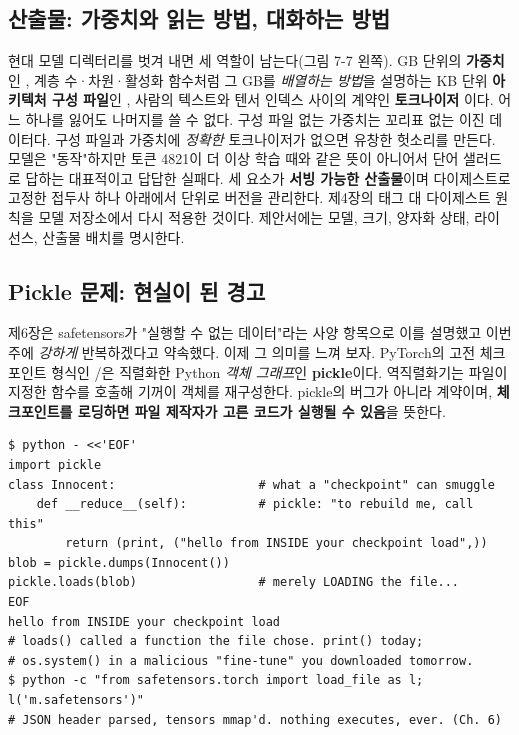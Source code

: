\subsection*{산출물: 가중치와 읽는 방법, 대화하는 방법}

현대 모델 디렉터리를 벗겨 내면 세 역할이 남는다(그림 7-7 왼쪽). GB 단위의 \textbf{가중치}인 , 계층 수·차원·활성화 함수처럼 그 GB를 \textit{배열하는 방법}을 설명하는 KB 단위 \textbf{아키텍처 구성 파일}인 , 사람의 텍스트와 텐서 인덱스 사이의 계약인 \textbf{토크나이저} 이다. 어느 하나를 잃어도 나머지를 쓸 수 없다. 구성 파일 없는 가중치는 꼬리표 없는 이진 데이터다. 구성 파일과 가중치에 \textit{정확한} 토크나이저가 없으면 유창한 헛소리를 만든다. 모델은 "동작"하지만 토큰 4821이 더 이상 학습 때와 같은 뜻이 아니어서 단어 샐러드로 답하는 대표적이고 답답한 실패다. 세 요소가 \textbf{서빙 가능한 산출물}이며 다이제스트로 고정한 접두사 하나 아래에서 단위로 버전을 관리한다. 제4장의 태그 대 다이제스트 원칙을 모델 저장소에서 다시 적용한 것이다. 제안서에는 모델, 크기, 양자화 상태, 라이선스, 산출물 배치를 명시한다.

\subsection*{Pickle 문제: 현실이 된 경고}

제6장은 safetensors가 "실행할 수 없는 데이터"라는 사양 항목으로 이를 설명했고 이번 주에 \textit{강하게} 반복하겠다고 약속했다. 이제 그 의미를 느껴 보자. PyTorch의 고전 체크포인트 형식인 /은 직렬화한 Python \textit{객체 그래프}인 \textbf{pickle}이다. 역직렬화기는 파일이 지정한 함수를 호출해 기꺼이 객체를 재구성한다. pickle의 버그가 아니라 계약이며, \textbf{체크포인트를 로딩하면 파일 제작자가 고른 코드가 실행될 수 있음}을 뜻한다.

\begin{terminalbox}
\begin{Verbatim}[breaklines=true,breakanywhere=true,fontsize=\small,formatcom=\color{tbbtermfg},codes=\tbbcodeactive]
$ python - <<'EOF'
import pickle
class Innocent:                    # what a "checkpoint" can smuggle
    def __reduce__(self):          # pickle: "to rebuild me, call this"
        return (print, ("hello from INSIDE your checkpoint load",))
blob = pickle.dumps(Innocent())
pickle.loads(blob)                 # merely LOADING the file...
EOF
hello from INSIDE your checkpoint load
# loads() called a function the file chose. print() today;
# os.system() in a malicious "fine-tune" you downloaded tomorrow.
$ python -c "from safetensors.torch import load_file as l; l('m.safetensors')"
# JSON header parsed, tensors mmap'd. nothing executes, ever. (Ch. 6)
\end{Verbatim}
\end{terminalbox}

